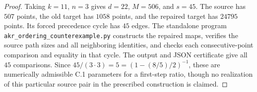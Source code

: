 \begin{proof}
Taking $k=11$, $n=3$ gives $d=22$, $M=506$, and $s=45$.
The source has $507$ points, the old target has $1058$ points,
and the repaired target has $24795$ points. Its forced precedence
cycle has $45$ edges. The standalone program
\texttt{akr\_ordering\_counterexample.py} constructs the repaired
maps, verifies the source path sizes and all neighboring identities,
and checks each consecutive-point comparison and equality in that
cycle. The output and JSON certificate give all $45$ comparisons.
Since $45/(3\cdot3)=5=(1-(8/5)/2)^{-1}$, these are numerically
admissible C.1 parameters for a first-step ratio, though no realization
of this particular source pair in the prescribed construction is
claimed.
\end{proof}
